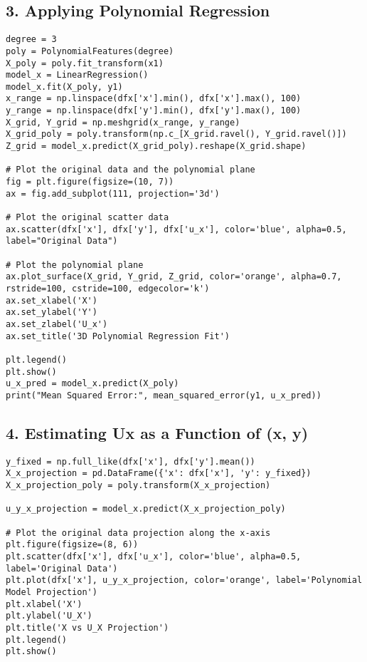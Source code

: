 \documentclass{article}
\begin{document}
\subsection*{3. Applying Polynomial Regression}
\begin{lstlisting}[style=python]
degree = 3
poly = PolynomialFeatures(degree)
X_poly = poly.fit_transform(x1)
model_x = LinearRegression()
model_x.fit(X_poly, y1)
x_range = np.linspace(dfx['x'].min(), dfx['x'].max(), 100)
y_range = np.linspace(dfx['y'].min(), dfx['y'].max(), 100)
X_grid, Y_grid = np.meshgrid(x_range, y_range)
X_grid_poly = poly.transform(np.c_[X_grid.ravel(), Y_grid.ravel()])
Z_grid = model_x.predict(X_grid_poly).reshape(X_grid.shape)

# Plot the original data and the polynomial plane
fig = plt.figure(figsize=(10, 7))
ax = fig.add_subplot(111, projection='3d')

# Plot the original scatter data
ax.scatter(dfx['x'], dfx['y'], dfx['u_x'], color='blue', alpha=0.5, label="Original Data")

# Plot the polynomial plane
ax.plot_surface(X_grid, Y_grid, Z_grid, color='orange', alpha=0.7, rstride=100, cstride=100, edgecolor='k')
ax.set_xlabel('X')
ax.set_ylabel('Y')
ax.set_zlabel('U_x')
ax.set_title('3D Polynomial Regression Fit')

plt.legend()
plt.show()
u_x_pred = model_x.predict(X_poly)
print("Mean Squared Error:", mean_squared_error(y1, u_x_pred))
\end{lstlisting}

\subsection*{4. Estimating Ux as a Function of (x, y)}
\begin{lstlisting}[style=python]
y_fixed = np.full_like(dfx['x'], dfx['y'].mean())
X_x_projection = pd.DataFrame({'x': dfx['x'], 'y': y_fixed})
X_x_projection_poly = poly.transform(X_x_projection)

u_y_x_projection = model_x.predict(X_x_projection_poly)

# Plot the original data projection along the x-axis
plt.figure(figsize=(8, 6))
plt.scatter(dfx['x'], dfx['u_x'], color='blue', alpha=0.5, label='Original Data')
plt.plot(dfx['x'], u_y_x_projection, color='orange', label='Polynomial Model Projection')
plt.xlabel('X')
plt.ylabel('U_X')
plt.title('X vs U_X Projection')
plt.legend()
plt.show()
\end{lstlisting}
\end{document}
